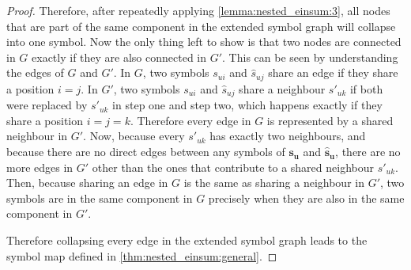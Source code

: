 \begin{proof}
    Therefore, after repeatedly applying \cref{lemma:nested_einsum:3},
    all nodes that are part of the same component in the extended symbol graph will collapse into one symbol.
    Now the only thing left to show is that two nodes are connected in $G$ exactly if they are also connected in $G'$.
    This can be seen by understanding the edges of $G$ and $G'$.
    In $G$, two symbols $s_{ui}$ and $\hat{s}_{uj}$ share an edge if they share a position $i = j$.
    In $G'$, two symbols $s_{ui}$ and $\hat{s}_{uj}$ share a neighbour $s'_{uk}$ if both were replaced by $s'_{uk}$ in step one and step two,
    which happens exactly if they share a position $i = j = k$.
    Therefore every edge in $G$ is represented by a shared neighbour in $G'$.
    Now, because every $s'_{uk}$ has exactly two neighbours, and because there are no direct edges between any symbols of $\bm{s_u}$ and $\bm{\hat{s}_u}$, there are no more edges in $G'$ other than the ones that contribute to a shared neighbour $s'_{uk}$.
    Then, because sharing an edge in $G$ is the same as sharing a neighbour in $G'$, two symbols are in the same component in $G$ precisely when they are also in the same component in $G'$.

    Therefore collapsing every edge in the extended symbol graph leads to the symbol map defined in \cref{thm:nested_einsum:general}.
\end{proof}